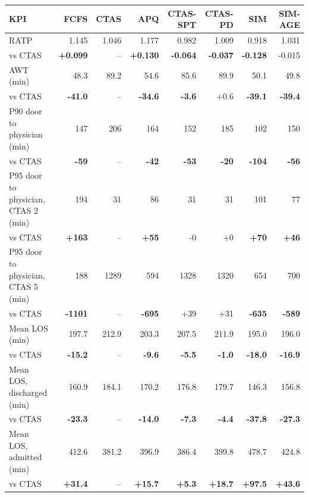 \begin{tabular}{lrrrrrrr}
\toprule
KPI & FCFS & CTAS & APQ & CTAS-SPT & CTAS-PD & SIM & SIM-AGE \\
\midrule
RATP & 1.145 & 1.046 & 1.177 & 0.982 & 1.009 & 0.918 & 1.031 \\
\quad vs CTAS & \textbf{+0.099} & -- & \textbf{+0.130} & \textbf{-0.064} & \textbf{-0.037} & \textbf{-0.128} & -0.015 \\
AWT (min) & 48.3 & 89.2 & 54.6 & 85.6 & 89.9 & 50.1 & 49.8 \\
\quad vs CTAS & \textbf{-41.0} & -- & \textbf{-34.6} & \textbf{-3.6} & +0.6 & \textbf{-39.1} & \textbf{-39.4} \\
P90 door to physician (min) & 147 & 206 & 164 & 152 & 185 & 102 & 150 \\
\quad vs CTAS & \textbf{-59} & -- & \textbf{-42} & \textbf{-53} & \textbf{-20} & \textbf{-104} & \textbf{-56} \\
P95 door to physician, CTAS 2 (min) & 194 & 31 & 86 & 31 & 31 & 101 & 77 \\
\quad vs CTAS & \textbf{+163} & -- & \textbf{+55} & -0 & +0 & \textbf{+70} & \textbf{+46} \\
P95 door to physician, CTAS 5 (min) & 188 & 1289 & 594 & 1328 & 1320 & 654 & 700 \\
\quad vs CTAS & \textbf{-1101} & -- & \textbf{-695} & +39 & +31 & \textbf{-635} & \textbf{-589} \\
Mean LOS (min) & 197.7 & 212.9 & 203.3 & 207.5 & 211.9 & 195.0 & 196.0 \\
\quad vs CTAS & \textbf{-15.2} & -- & \textbf{-9.6} & \textbf{-5.5} & \textbf{-1.0} & \textbf{-18.0} & \textbf{-16.9} \\
Mean LOS, discharged (min) & 160.9 & 184.1 & 170.2 & 176.8 & 179.7 & 146.3 & 156.8 \\
\quad vs CTAS & \textbf{-23.3} & -- & \textbf{-14.0} & \textbf{-7.3} & \textbf{-4.4} & \textbf{-37.8} & \textbf{-27.3} \\
Mean LOS, admitted (min) & 412.6 & 381.2 & 396.9 & 386.4 & 399.8 & 478.7 & 424.8 \\
\quad vs CTAS & \textbf{+31.4} & -- & \textbf{+15.7} & \textbf{+5.3} & \textbf{+18.7} & \textbf{+97.5} & \textbf{+43.6} \\
\bottomrule
\end{tabular}